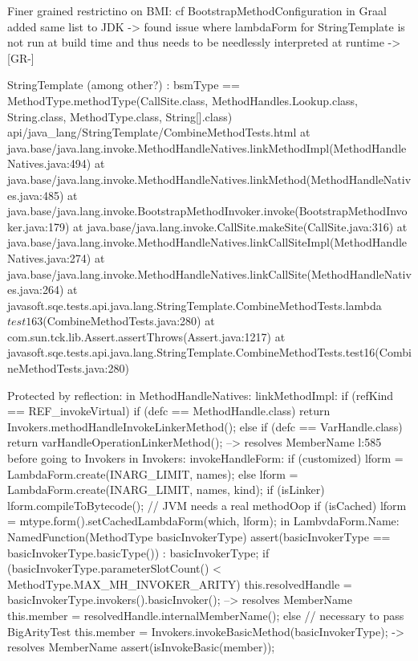 Finer grained restrictino on BMI:
cf BootstrapMethodConfiguration in Graal
added same list to JDK -> found issue where lambdaForm for StringTemplate is not run at build time and thus needs to be needlessly interpreted at runtime  -> [GR-]

StringTemplate (among other?) : bsmType == MethodType.methodType(CallSite.class, MethodHandles.Lookup.class, String.class, MethodType.class, String[].class)
api/java_lang/StringTemplate/CombineMethodTests.html
      at java.base/java.lang.invoke.MethodHandleNatives.linkMethodImpl(MethodHandleNatives.java:494)
      at java.base/java.lang.invoke.MethodHandleNatives.linkMethod(MethodHandleNatives.java:485)
      at java.base/java.lang.invoke.BootstrapMethodInvoker.invoke(BootstrapMethodInvoker.java:179)
      at java.base/java.lang.invoke.CallSite.makeSite(CallSite.java:316)
      at java.base/java.lang.invoke.MethodHandleNatives.linkCallSiteImpl(MethodHandleNatives.java:274)
      at java.base/java.lang.invoke.MethodHandleNatives.linkCallSite(MethodHandleNatives.java:264)
      at javasoft.sqe.tests.api.java.lang.StringTemplate.CombineMethodTests.lambda$test16$3(CombineMethodTests.java:280)
      at com.sun.tck.lib.Assert.assertThrows(Assert.java:1217)
      at javasoft.sqe.tests.api.java.lang.StringTemplate.CombineMethodTests.test16(CombineMethodTests.java:280)

Protected by reflection:
in MethodHandleNatives:
linkMethodImpl:
if (refKind == REF_invokeVirtual) {
            if (defc == MethodHandle.class) {
                return Invokers.methodHandleInvokeLinkerMethod();
            } else if (defc == VarHandle.class) {
                return varHandleOperationLinkerMethod(); --> resolves MemberName l:585 before going to Invokers
            }
        }
in Invokers:
invokeHandleForm:
    if (customized) {
        lform = LambdaForm.create(INARG_LIMIT, names);
    } else {
        lform = LambdaForm.create(INARG_LIMIT, names, kind);
    }
    if (isLinker)
        lform.compileToBytecode();  // JVM needs a real methodOop
    if (isCached)
        lform = mtype.form().setCachedLambdaForm(which, lform);
in LambvdaForm.Name:
    NamedFunction(MethodType basicInvokerType) {
        assert(basicInvokerType == basicInvokerType.basicType()) : basicInvokerType;
        if (basicInvokerType.parameterSlotCount() < MethodType.MAX_MH_INVOKER_ARITY) {
            this.resolvedHandle = basicInvokerType.invokers().basicInvoker(); --> resolves MemberName
            this.member = resolvedHandle.internalMemberName();
        } else {
            // necessary to pass BigArityTest
            this.member = Invokers.invokeBasicMethod(basicInvokerType); -> resolves MemberName
        }
        assert(isInvokeBasic(member));
    }

